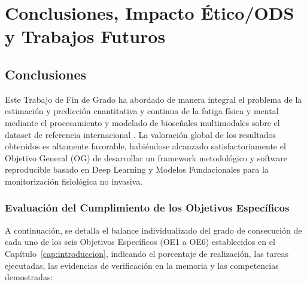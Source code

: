 
\chapter{Conclusiones, Impacto Ético/ODS y Trabajos Futuros}
\label{cap:conclusiones}

\section{Conclusiones}
\label{sec:conclusiones_generales}

Este Trabajo de Fin de Grado ha abordado de manera integral el problema de la estimación y predicción cuantitativa y continua de la fatiga física y mental mediante el procesamiento y modelado de bioseñales multimodales sobre el dataset de referencia internacional \fatigueset{}. La valoración global de los resultados obtenidos es altamente favorable, habiéndose alcanzado satisfactoriamente el Objetivo General (OG) de desarrollar un framework metodológico y software reproducible basado en Deep Learning y Modelos Fundacionales para la monitorización fisiológica no invasiva.

\subsection{Evaluación del Cumplimiento de los Objetivos Específicos}

A continuación, se detalla el balance individualizado del grado de consecución de cada uno de los seis Objetivos Específicos (OE1 a OE6) establecidos en el Capítulo~\ref{cap:introduccion}, indicando el porcentaje de realización, las tareas ejecutadas, las evidencias de verificación en la memoria y las competencias demostradas:

